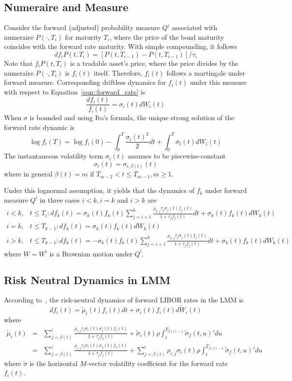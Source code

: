 \subsection{Numeraire and Measure}
Consider the forward (adjusted) probability measure $Q^i$ associated with numeraire $P(\cdot,T_i)$ for maturity $T_i$, where the price of the bond maturity coincides with the forward rate maturity. With simple compounding, it follows
$$
d f_i P(t,T_i) = [P(t,T_{i-1}) - P(t,T_{i-1})] / \tau_i
$$
Note that $f_i P(t,T_i)$ is a tradable asset's price, where the price divides by the numeraire $P(\cdot,T_i)$ is $f_i(t)$ itself. Therefore, $f_i(t)$ follows a martingale under forward measure. Corresponding driftless dynamics for $f_i(t)$ under this measure with respect to Equation~\ref{eqn::forward_rate} is
$$
\frac{d f_i(t)}{f_i(t)} = \sigma_i(t) dW_i(t)
$$
When $\sigma$ is bounded and using Ito's formula, the unique strong solution of the forward rate dynamic is
$$
\log f_i (T) = \log f_i(0) - \int_0^T \frac{\sigma_i(t)^2}{2} dt + \int_0^T \sigma_i(t) dW_i(t)
$$
The instantaneous volatility term $\sigma_i(t)$ assumes to be piecewise-constant
$$
\sigma_i(t) = \sigma_{i,\beta(t)}(t)
$$
where in general $\beta(t)=m$ if $T_{m-2}<t \leq T_{m-1}, m\geq 1$.

Under this lognormal assumption, it yields that the dynamics of $f_k$ under forward measure $Q^i$ in three cases $i<k, i=k$ and $i>k$ are
\begin{eqnarray*}
i<k,& t\leq T_i: df_k(t) = \sigma_k(t)f_k(t)\sum_{j=i+1}^{k}\frac{\rho_{k,j}\tau_j\sigma_j(t)f_j(t)}{1+\tau_j f_j(t)}dt + \sigma_k(t) f_k(t) dW_k(t) \\
i=k,& t\leq T_{k-1}: df_k(t) = \sigma_k(t) f_k(t) dW_k(t) \\
i>k,& t\leq T_{k-1}: df_k(t) = -\sigma_k(t)f_k(t)\sum_{j=i+1}^{k}\frac{\rho_{k,j}\tau_j\sigma_j(t)f_j(t)}{1+\tau_j f_j(t)}dt + \sigma_k(t) f_k(t) dW_k(t)
\end{eqnarray*}
where $W=W^i$ is a Brownian motion under $Q^i$. 

\subsection{Risk Neutral Dynamics in LMM}
According to~\cite{bm06}, the risk-neutral dynamics of forward LIBOR rates in the LMM is 
$$
d f_i(t) = \tilde{\mu}_i(t) f_i(t)dt + \sigma_i(t)f_i(t) d \tilde{W}_i(t)
$$
where
\begin{eqnarray*}
\tilde{\mu}_i(t) &=& \sum_{j=\beta(t)}^{i} \frac{\rho_{i,j}\tau_j\sigma_i(t)\sigma_j(t)f_j(t)}{1+\tau_j f_j(t)} + \tilde{\sigma}_i(t)\rho\int_t^{T_{\beta(t)-1}}\tilde{\sigma}_f(t,u)'du \\
                 &=& \sum_{j=\beta(t)}^{i} \frac{\rho_{i,j}\tau_j\sigma_i(t)\sigma_j(t)f_j(t)}{1+\tau_j f_j(t)} + \sum_{j=\beta(t)}^{i} \rho_{i,j}\sigma_i(t)\rho\int_t^{T_{\beta(t)-1}}\tilde{\sigma}_f(t,u)'du
\end{eqnarray*}
where $\tilde{\sigma}$ is the horizontal $M$-vector volatility coefficient for the forward rate $f_i(t)$. 



